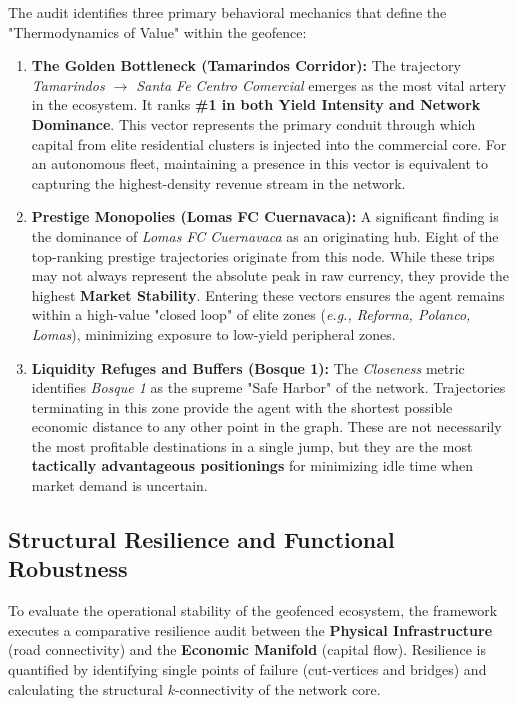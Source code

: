 The audit identifies three primary behavioral mechanics that define the "Thermodynamics of Value" within the geofence:

\begin{enumerate}[noitemsep, topsep=3pt]
    \item \textbf{The Golden Bottleneck (Tamarindos Corridor):} The trajectory \textit{Tamarindos $\rightarrow$ Santa Fe Centro Comercial} emerges as the most vital artery in the ecosystem. It ranks \textbf{\#1 in both Yield Intensity and Network Dominance}. This vector represents the primary conduit through which capital from elite residential clusters is injected into the commercial core. For an autonomous fleet, maintaining a presence in this vector is equivalent to capturing the highest-density revenue stream in the network.
    
    \item \textbf{Prestige Monopolies (Lomas FC Cuernavaca):} A significant finding is the dominance of \textit{Lomas FC Cuernavaca} as an originating hub. Eight of the top-ranking prestige trajectories originate from this node. While these trips may not always represent the absolute peak in raw currency, they provide the highest \textbf{Market Stability}. Entering these vectors ensures the agent remains within a high-value "closed loop" of elite zones (\textit{e.g., Reforma, Polanco, Lomas}), minimizing exposure to low-yield peripheral zones.
    
    \item \textbf{Liquidity Refuges and Buffers (Bosque 1):} The \textit{Closeness} metric identifies \textit{Bosque 1} as the supreme "Safe Harbor" of the network. Trajectories terminating in this zone provide the agent with the shortest possible economic distance to any other point in the graph. These are not necessarily the most profitable destinations in a single jump, but they are the most \textbf{tactically advantageous positionings} for minimizing idle time when market demand is uncertain.
\end{enumerate}



\subsection{Structural Resilience and Functional Robustness}

To evaluate the operational stability of the geofenced ecosystem, the framework executes a comparative resilience audit between the \textbf{Physical Infrastructure} (road connectivity) and the \textbf{Economic Manifold} (capital flow). Resilience is quantified by identifying single points of failure (cut-vertices and bridges) and calculating the structural $k$-connectivity of the network core.


